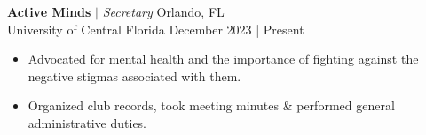\documentclass[a4paper,9pt]{extarticle}
\newcommand{\SimpleItem}[2]{ \item[] \noindent\hbox to 0.175\textwidth{{#1}} #2}
\begin{document}
\bigskip

\noindent\textbf{Active Minds} $\vert$ \textit{Secretary} \hfill Orlando, FL \\ 
University of Central Florida \hfill December 2023 | Present
\begin{itemize}
    \item Advocated for mental health and the importance of fighting against the negative stigmas associated with them.
    \item Organized club records, took meeting minutes \& performed general administrative duties. 
\end{itemize}








      

\end{document}
